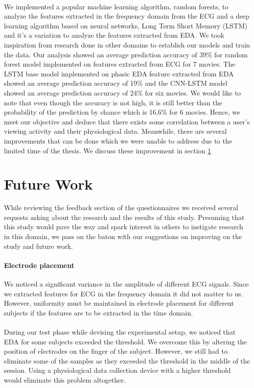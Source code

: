 \paragraph{} We implemented a popular machine learning algorithm, random forests, to analyze the features extracted in the frequency domain from the ECG and a deep learning algorithm based on neural networks, Long Term Short Memory (LSTM) and it's a variation to analyze the features extracted from EDA. We took inspiration from research done in other domains to establish our models and train the data. Our analysis showed an average prediction accuracy of 39\% for random forest model implemented on features extracted from ECG for 7 movies. The LSTM base model implemented on phasic EDA feature extracted from EDA showed an average prediction accuracy of 19\% and the CNN-LSTM model showed an average prediction accuracy of 24\% for six movies. We would like to note that even though the accuracy is not high, it is still better than the probability of the prediction by chance which is 16.6\% for 6 movies. Hence, we meet our objective and deduce that there exists some correlation between a user's viewing activity and their physiological data. Meanwhile, there are several improvements that can be done which we were unable to address due to the limited time of the thesis. We discuss these improvement in section \ref{sec:future_work}

\section{Future Work}
\label{sec:future_work}
While reviewing the feedback section of the questionnaires we received several requests asking about the research and the results of this study. Presuming that this study would pave the way and spark interest in others to instigate research in this domain, we pass on the baton with our suggestions on improving on the study and future work.

\paragraph{Electrode placement} We noticed a significant variance in the amplitude of different ECG signals. Since we extracted features for ECG in the frequency domain it did not matter to us. However, uniformity must be maintained in electrode placement for different subjects if the features are to be extracted in the time domain.

\paragraph{} During our test phase while devising the experimental setup, we noticed that EDA for some subjects exceeded the threshold. We overcome this by altering the position of electrodes on the finger of the subject. However, we still had to eliminate some of the samples as they exceeded the threshold in the middle of the session. Using a physiological data collection device with a higher threshold would eliminate this problem altogether.

